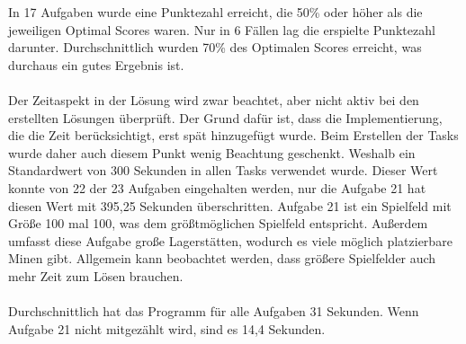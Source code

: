 In 17 Aufgaben wurde eine Punktezahl erreicht, die 50\% oder höher als die jeweiligen Optimal Scores waren. Nur in 6 Fällen lag die erspielte Punktezahl darunter. Durchschnittlich wurden 70\% des Optimalen Scores erreicht, was durchaus ein gutes Ergebnis ist.
\\\\
Der Zeitaspekt in der Lösung wird zwar beachtet, aber nicht aktiv bei den erstellten Lösungen überprüft. Der Grund dafür ist, dass die Implementierung, die die Zeit berücksichtigt, erst spät hinzugefügt wurde. Beim Erstellen der Tasks wurde daher auch diesem Punkt wenig Beachtung geschenkt. Weshalb ein Standardwert von 300 Sekunden in allen Tasks verwendet wurde. Dieser Wert konnte von 22 der 23 Aufgaben eingehalten werden, nur die Aufgabe 21 hat diesen Wert mit 395,25 Sekunden überschritten. 
Aufgabe 21 ist ein Spielfeld mit Größe 100 mal 100, was dem größtmöglichen Spielfeld entspricht. Außerdem umfasst diese Aufgabe große Lagerstätten, wodurch es viele möglich platzierbare Minen gibt. Allgemein kann beobachtet werden, dass größere Spielfelder auch mehr Zeit zum Lösen brauchen. 
\\\\
Durchschnittlich hat das Programm für alle Aufgaben 31 Sekunden. Wenn Aufgabe 21 nicht mitgezählt wird, sind es 14,4 Sekunden. 












